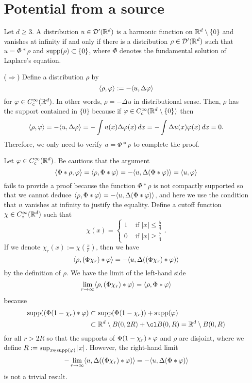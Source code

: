 \documentclass[a4paper]{article}
\begin{document}
\tableofcontents

\newpage

\section{Potential from a source}

\begin{thm*}
Let $d\ge3$.
A distribution $u\in\mathcal{D}'(\mathbb{R}^d)$ is a harmonic function on $\mathbb{R}^d\setminus\{0\}$ and vanishes at infinity if and only if there is a distribution $\rho\in\mathcal{D}'(\mathbb{R}^d)$ such that $u=\Phi*\rho$ and $\operatorname{supp}(\rho)\subset\{0\}$, where $\Phi$ denotes the fundamental solution of Laplace's equation.
\end{thm*}
\begin{pf}
($\Rightarrow$)
Define a distribution $\rho$ by
\[\langle\rho,\varphi\rangle:=-\langle u,\Delta\varphi\rangle\]
for $\varphi\in C_c^\infty(\mathbb{R}^d)$.
In other words, $\rho=-\Delta u$ in distributional sense.
Then, $\rho$ has the support contained in $\{0\}$ because if $\varphi\in C_c^\infty(\mathbb{R}^d\setminus\{0\})$ then
\[\langle\rho,\varphi\rangle=-\langle u,\Delta \varphi\rangle=-\int u(x)\Delta\varphi(x)\,dx=-\int\Delta u(x)\varphi(x)\,dx=0.\]
Therefore, we only need to verify $u=\Phi*\rho$ to complete the proof.

Let $\varphi\in C_c^\infty(\mathbb{R}^d)$.
Be cautious that the argument
\[\langle\Phi*\rho,\varphi\rangle=\langle\rho,\Phi*\varphi\rangle=-\langle u,\Delta(\Phi*\varphi)\rangle=\langle u,\varphi\rangle\]
fails to provide a proof because the function $\Phi*\rho$ is not compactly supported so that we cannot deduce $\langle\rho,\Phi*\varphi\rangle=-\langle u,\Delta(\Phi*\varphi)\rangle$, and here we use the condition that $u$ vanishes at infinity to justify the equality.
Define a cutoff function $\chi\in C_c^\infty(\mathbb{R}^d)$ such that
\[\chi(x)=\begin{cases}1&\text{ if }|x|\le\frac54\\0&\text{ if }|x|\ge\frac74\end{cases}.\]
If we denote $\chi_r(x):=\chi(\frac xr)$, then we have
\[\langle\rho,(\Phi\chi_r)*\varphi\rangle=-\langle u,\Delta((\Phi\chi_r)*\varphi)\rangle\]
by the definition of $\rho$.
We have the limit of the left-hand side
\[\lim_{r\to\infty}\langle\rho,(\Phi\chi_r)*\varphi\rangle=\langle\rho,\Phi*\varphi\rangle\]
because
\begin{align*}
\supp((\Phi(1-\chi_r)*\f)&\subset\supp(\Phi(1-\chi_r))+\supp(\f)\\
&\subset\R^d\setminus B(0,2R)+\cl B(0,R)=\R^d\setminus B(0,R)
\end{align*}
for all $r>2R$ so that the supports of $\Phi(1-\chi_r)*\varphi$ and $\rho$ are disjoint, where we define $R:=\sup_{x\in\operatorname{supp}(\varphi)}|x|$.
However, the right-hand limit
\[-\lim_{r\to\infty}\langle u,\Delta((\Phi\chi_r)*\varphi)\rangle=-\langle u,\Delta(\Phi*\varphi)\rangle\]
is not a trivial result.


\end{pf}
\end{document}
